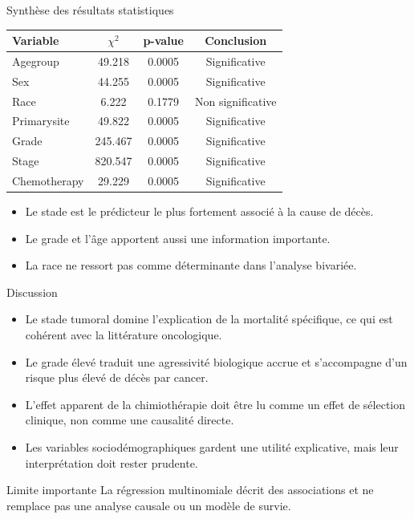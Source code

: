 \documentclass[10pt,aspectratio=169]{beamer}
\begin{document}
\begin{frame}{Synthèse des résultats statistiques}
\small
\begin{table}
\centering
\begin{tabular}{@{}lccc@{}}
\toprule
\textbf{Variable} & \textbf{$\chi^2$} & \textbf{p-value} & \textbf{Conclusion} \\
\midrule
Agegroup & 49.218 & 0.0005 & Significative \\
Sex & 44.255 & 0.0005 & Significative \\
Race & 6.222 & 0.1779 & Non significative \\
Primarysite & 49.822 & 0.0005 & Significative \\
Grade & 245.467 & 0.0005 & Significative \\
Stage & 820.547 & 0.0005 & Significative \\
Chemotherapy & 29.229 & 0.0005 & Significative \\
\bottomrule
\end{tabular}
\end{table}
\vspace{0.5em}
\begin{itemize}
  \item Le stade est le prédicteur le plus fortement associé à la cause de décès.
  \item Le grade et l’âge apportent aussi une information importante.
  \item La race ne ressort pas comme déterminante dans l’analyse bivariée.
\end{itemize}
\end{frame}

\begin{frame}{Discussion}
\begin{itemize}
  \item Le stade tumoral domine l’explication de la mortalité spécifique, ce qui est cohérent avec la littérature oncologique.
  \item Le grade élevé traduit une agressivité biologique accrue et s’accompagne d’un risque plus élevé de décès par cancer.
  \item L’effet apparent de la chimiothérapie doit être lu comme un effet de sélection clinique, non comme une causalité directe.
  \item Les variables sociodémographiques gardent une utilité explicative, mais leur interprétation doit rester prudente.
\end{itemize}
\vspace{0.5em}
\begin{block}{Limite importante}
La régression multinomiale décrit des associations et ne remplace pas une analyse causale ou un modèle de survie.
\end{block}
\end{frame}
\end{document}
